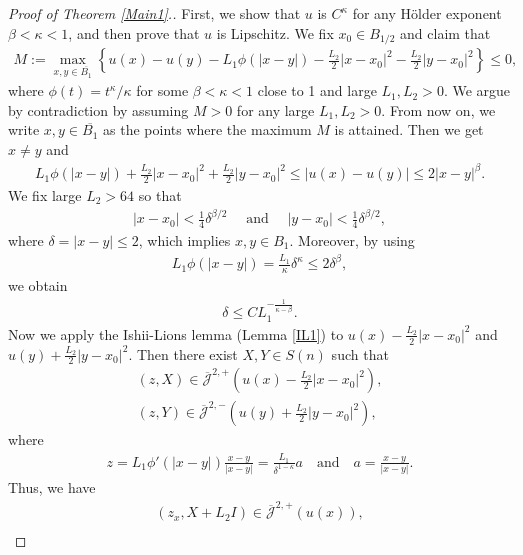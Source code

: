 \documentclass[reqno]{amsart}
\theoremstyle{plain}
\theoremstyle{definition}
\theoremstyle{remark}
\numberwithin{equation}{section}
\begin{document}
\begin{proof}[Proof of Theorem \ref{Main1}.]
    First, we show that $u$ is $C^\kappa$ for any H{\"o}lder exponent $\beta<\kappa<1$, and then prove that $u$ is Lipschitz. We fix $x_0 \in B_{1/2}$ and claim that
    \begin{align} \label{intish}
        M:= \max_{x,y\in \overline{B_1}} \left\{ u(x) - u(y) - L_1\phi(|x-y|) - \frac{L_2}{2}|x-x_0|^2 -\frac{L_2}{2}|y-x_0|^2 \right\} \leq 0,
    \end{align}
    where $\phi(t) = t^\kappa/\kappa$ for some $\beta<\kappa<1$ close to 1 and large $L_1,L_2>0$.
    We argue by contradiction by assuming $M>0$ for any large $L_1, L_2>0$.
    From now on, we write $x,y \in \overline{B_1}$ as the points where the maximum $M$ is attained.
    Then we get $x\neq y$ and 
    \begin{align*}
        L_1 \phi(|x-y|) + \frac{L_2}{2}|x-x_0|^2 +\frac{L_2}{2}|y-x_0|^2 \leq |u(x)-u(y)| \leq 2|x-y|^\beta.
    \end{align*}
    We fix large $L_2 > 64$ so that
    \begin{align} \label{xest}
        |x-x_0| < \frac{1}{4}\delta^{\beta/2} \quad \text{ and } \quad  |y-x_0| < \frac{1}{4}\delta^{\beta/2},
    \end{align}
    where $\delta = |x-y| \leq 2$, which implies $x,y \in B_1$.
    Moreover, by using
    \begin{align*}
        L_1 \phi(|x-y|) = \frac{L_1}{\kappa}\delta^\kappa \leq 2\delta^\beta,
    \end{align*}
     we obtain
     \begin{align} \label{dest}
         \delta \leq CL_1^{-\frac{1}{\kappa-\beta}}.
     \end{align}
     Now we apply the Ishii-Lions lemma (Lemma \ref{IL1}) to $u(x)- \frac{L_2}{2}|x-x_0|^2$ and $u(y) + \frac{L_2}{2}|y-x_0|^2$. Then there exist $X,Y \in S(n)$ such that
     \begin{align*}
          (z, X)\in \overline{\mathcal{J}}^{2,+} \left( u(x)- \frac{L_2}{2}|x-x_0|^2\right), \\
          (z, Y)\in \overline{\mathcal{J}}^{2,-} \left( u(y)+ \frac{L_2}{2}|y-x_0|^2\right),
     \end{align*}
     where 
     \begin{align} \label{zest2}
         z= L_1\phi'(|x-y|)\frac{x-y}{|x-y|} = \frac{L_1} {\delta^{1-\kappa}} a \quad \text{and} \quad a= \frac{x-y}{|x-y|}.
     \end{align}
     Thus, we have
     \begin{align*}
         (z_x, X+L_2I)\in \overline{\mathcal{J}}^{2,+} \left( u(x)\right), \\

\end{align*}
\end{proof}
\end{document}
